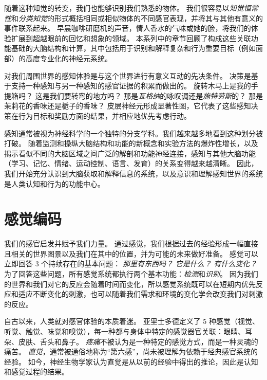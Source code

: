 随着这种知觉的转变，我们也能够识别我们熟悉的物体。
我们很容易以\textit{知觉恒常性}和\textit{分类知觉}的形式概括相同或相似物体的不同感官表现，并将其与其他有意义的事件联系起来。
早晨咖啡研磨机的声音，情人香水的气味或她的脸，将我们的体验扩展到超越眼前的回忆和想象的领域。
本系列中的章节回顾了构成这些关联功能基础的大脑结构和计算，其中包括用于识别和解释复杂和行为重要目标（例如面部）的高度专业化的神经元系统。


对我们周围世界的感知体验是与这个世界进行有意义互动的先决条件。
决策是基于支持一种感知与另一种感知的感官证据的积累而做出的。
旋转木马上是我的手提箱吗？
这是我们要转弯的地方吗？
那是\textit{瓦格纳}的咏叹调还是\textit{施特劳斯}的？
那是茉莉花的香味还是栀子的香味？
皮层神经元形成显著性图，它代表了这些感知决策在行为目标和奖励方面的结果，并相应地优先考虑行动。


感知通常被视为神经科学的一个独特的分支学科。我们越来越多地看到这种划分被打破。
随着监测和操纵大脑结构和功能的新概念和实验方法的爆炸性增长，以及揭示看似不同的大脑区域之间广泛的解剖和功能神经连接，感知与其他大脑功能（学习、记忆、情绪、运动控制、语言、发育）的关系变得越来越清晰。
因此，我们开始充分认识到大脑获取和解释信息的系统，以及意识和理解感知世界的系统是人类认知和行为的功能中心。



\chapter{感觉编码} \label{chap:chap17}


我们的感官启发并赋予我们力量。
通过感觉，我们根据过去的经验形成一幅直接且相关的世界图景以及我们在其中的位置，并为可能的未来做好准备。 
感觉可以立即回答 3 个持续存在的基本问题：
\textit{那里有东西吗？}
\textit{它是什么？}
\textit{有什么变化？}
为了回答这些问题，所有感觉系统都执行两个基本功能：\textit{检测}和\textit{识别}。
因为我们的世界和我们对它的反应会随着时间而变化，所以感觉系统既可以在短期内优先反应和适应不断变化的刺激，也可以随着我们需求和环境的变化学会改变我们对刺激的反应。


自古以来，人类就对感官体验的本质着迷。
亚里士多德定义了 5 种感觉（视觉、听觉、触觉、味觉和嗅觉），每一种都与身体中特定的感觉器官关联：眼睛、耳朵、皮肤、舌头和鼻子。
\textit{疼痛}不被认为是一种特定的感觉方式，而是一种灵魂的痛苦。
\textit{直觉}，通常被通俗地称为“第六感”，尚未被理解为依赖于经典感官系统的经验。
如今，神经生物学家认为直觉是从以前的经验中得出的推论，因此是认知和感觉过程的结果。


